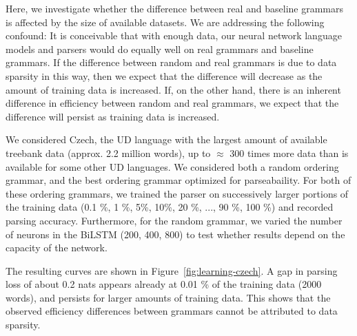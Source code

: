 \documentclass[10pt,twoside,lineno]{article}
\begin{document}
Here, we investigate whether the difference between real and baseline grammars is affected by the size of available datasets.
We are addressing the following confound: It is conceivable that with enough data, our neural network language models and parsers would do equally well on real grammars and baseline grammars.
If the difference between random and real grammars is due to data sparsity in this way, then we expect that the difference will decrease as the amount of training data is increased.
If, on the other hand, there is an inherent difference in efficiency between random and real grammars, we expect that the difference will persist as training data is increased.

We considered Czech, the UD language with the largest amount of available treebank data (approx. 2.2 million words), up to $\approx$ 300 times more data than is available for some other UD languages.
We considered both a random ordering grammar, and the best ordering grammar optimized for parseabaility.
For both of these ordering grammars, we trained the parser on successively larger portions of the training data (0.1 \%, 1 \%, 5\%, 10\%, 20 \%, ..., 90 \%, 100 \%) and recorded parsing accuracy.
Furthermore, for the random grammar, we varied the number of neurons in the BiLSTM (200, 400, 800) to test whether results depend on the capacity of the network.


The resulting curves are shown in Figure~\ref{fig:learning-czech}.
A gap in parsing loss of about 0.2 nats appears already at 0.01 \% of the training data (2000 words), and persists for larger amounts of training data.
This shows that the observed efficiency differences between grammars cannot be attributed to data sparsity. 
\end{document}
